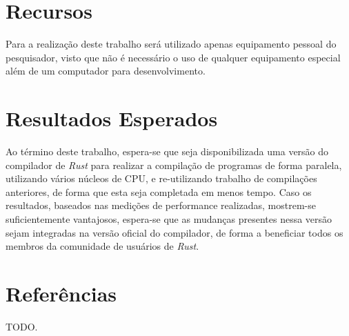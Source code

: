 \documentclass[12pt]{article}
\newcommand{\todo}[1]{\textsf{\color{red}#1}}
\begin{document}
\section{Recursos}

Para a realização deste trabalho será utilizado apenas equipamento pessoal do pesquisador, visto que não é necessário o uso de qualquer equipamento especial além de um computador para desenvolvimento.

\section{Resultados Esperados}

Ao término deste trabalho, espera-se que seja disponibilizada uma versão do compilador de \emph{Rust} para realizar a compilação de programas de forma paralela, utilizando vários núcleos de CPU, e re-utilizando trabalho de compilações anteriores, de forma que esta seja completada em menos tempo. Caso os resultados, baseados nas medições de performance realizadas, mostrem-se suficientemente vantajosos, espera-se que as mudanças presentes nessa versão sejam integradas na versão oficial do compilador, de forma a beneficiar todos os membros da comunidade de usuários de \emph{Rust}.

\section{Referências}

\todo{TODO.}
\end{document}
